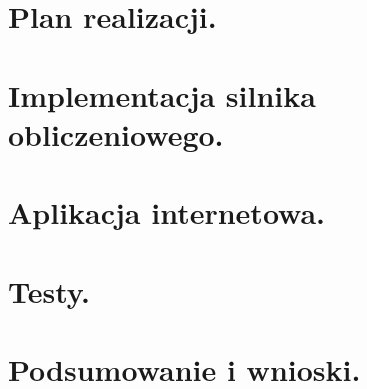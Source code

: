 \documentclass[a4paper,12pt]{article}		%
\begin{document}
\section{Plan realizacji.}
\section{Implementacja silnika obliczeniowego.}
\section{Aplikacja internetowa.}
\section{Testy.}
\section{Podsumowanie i wnioski.}
\end{document}

